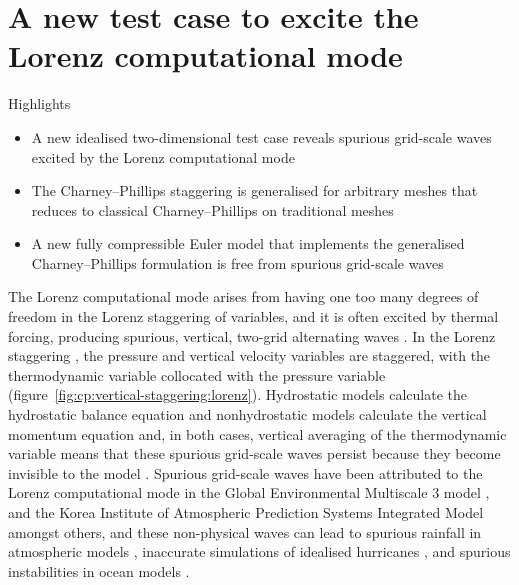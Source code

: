 \chapter{A new test case to excite the Lorenz computational mode}
\label{ch:cp}

\begin{highlights}
{\Large Highlights}
\begin{itemize}
	\item A new idealised two-dimensional test case reveals spurious grid-scale waves excited by the Lorenz computational mode
	\item The Charney--Phillips staggering is generalised for arbitrary meshes that reduces to classical Charney--Phillips on traditional meshes
	\item A new fully compressible Euler model that implements the generalised Charney--Phillips formulation is free from spurious grid-scale waves
\end{itemize}
\end{highlights}

The Lorenz computational mode arises from having one too many degrees of freedom in the Lorenz staggering of variables, and it is often excited by thermal forcing, producing spurious, vertical, two-grid alternating waves \citep{schneider1987,arakawa-konor1996}.
In the Lorenz staggering \citep{lorenz1960}, the pressure and vertical velocity variables are staggered, with the thermodynamic variable collocated with the pressure variable (figure~\ref{fig:cp:vertical-staggering:lorenz}).
Hydrostatic models calculate the hydrostatic balance equation and nonhydrostatic models calculate the vertical momentum equation and, in both cases, vertical averaging of the thermodynamic variable means that these spurious grid-scale waves persist because they become invisible to the model \citep{arakawa-konor1996}.
Spurious grid-scale waves have been attributed to the Lorenz computational mode in the Global Environmental Multiscale 3 model \citep{girard2014}, and the Korea Institute of Atmospheric Prediction Systems Integrated Model \citep{yi-park2017} amongst others, and these non-physical waves can lead to spurious rainfall in atmospheric models \citep{hollingsworth1995}, inaccurate simulations of idealised hurricanes \citep{zhu-smith2003}, and spurious instabilities in ocean models \citep{bell-white2017}.

